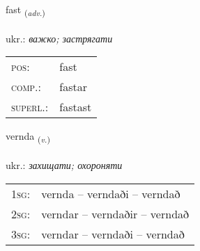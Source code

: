 \documentclass[frontgrid, backgrid]{flacards}\usepackage[]{graphicx}\usepackage[]{xcolor}
\begin{document}
\renewcommand{\flhead}{\vskip5pt \fboxsep=0pt {\small\bfseries\footnotesize Atviksorð | прислівник}}
\renewcommand{\fcfoot}{\vskip5pt \fboxsep=0pt \hspace{2pt}{\small\bfseries\footnotesize 2K}}

\renewcommand{\blhead}{\vskip5pt {\small\bfseries\footnotesize Atviksorð | прислівник }}
\renewcommand{\bcfoot}{\vskip5pt \hspace{2pt}{\small\bfseries\footnotesize 2K}}


{fast \small{\textsubscript{(\textit{adv.})}} \\[1ex] %
\textphonetic{[fast]} \\
ukr.: \emph{важко; застрягати} \\  [2ex]
\renewcommand*{\arraystretch}{0.8}
\begin{tabular}{ll}
\textsc{pos}: & fast \\ 
\textsc{comp.}: & fastar \\ 
\textsc{superl.}: & fastast \\
\end{tabular}
}

\renewcommand{\flhead}{\vskip5pt \fboxsep=0pt {\small\bfseries\footnotesize Sagnorð | дієслово}}
\renewcommand{\fcfoot}{\vskip5pt \fboxsep=0pt \hspace{2pt}{\small\bfseries\footnotesize 2K}}

\renewcommand{\blhead}{\vskip5pt {\small\bfseries\footnotesize Sagnorð | дієслово }}
\renewcommand{\bcfoot}{\vskip5pt \hspace{2pt}{\small\bfseries\footnotesize 2K}}


{vernda \small{\textsubscript{(\textit{v.})}} \\[1ex] %
\textphonetic{[vɛrnta]} \\
ukr.: \emph{захищати; охороняти} \\  [2ex]
\renewcommand*{\arraystretch}{0.8}
\begin{tabular}{p{1cm}l}
\textsc{1sg}: & vernda -- verndaði -- verndað \\ 
\textsc{2sg}: & verndar -- verndaðir -- verndað \\ 
\textsc{3sg}: & verndar -- verndaði -- verndað \\ 
\end{tabular}
}
\end{document}
